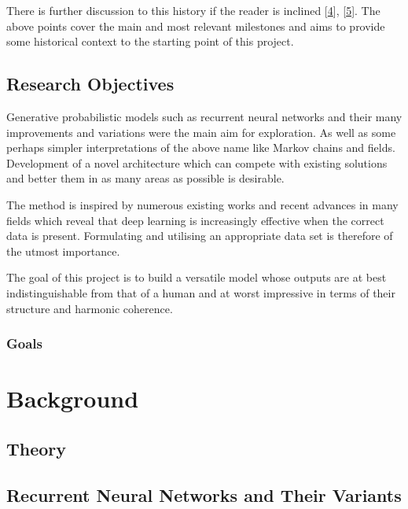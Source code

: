 \documentclass[12pt,]{article}
\begin{document}
There is further discussion to this history if the reader is inclined
{[}\protect\hyperlink{ref-mediumkylemcdonald}{4}{]},
{[}\protect\hyperlink{ref-libdlmusic}{5}{]}. The above points cover the
main and most relevant milestones and aims to provide some historical
context to the starting point of this project.

\hypertarget{research-objectives}{%
\subsection{Research Objectives}\label{research-objectives}}

Generative probabilistic models such as recurrent neural networks and
their many improvements and variations were the main aim for
exploration. As well as some perhaps simpler interpretations of the
above name like Markov chains and fields. Development of a novel
architecture which can compete with existing solutions and better them
in as many areas as possible is desirable.

The method is inspired by numerous existing works and recent advances in
many fields which reveal that deep learning is increasingly effective
when the correct data is present. Formulating and utilising an
appropriate data set is therefore of the utmost importance.

The goal of this project is to build a versatile model whose outputs are
at best indistinguishable from that of a human and at worst impressive
in terms of their structure and harmonic coherence.

\hypertarget{goals}{%
\subsubsection{Goals}\label{goals}}

\hypertarget{background}{%
\section{Background}\label{background}}

\hypertarget{theory}{%
\subsection{Theory}\label{theory}}

\hypertarget{recurrent-neural-networks-and-their-variants}{%
\subsection{Recurrent Neural Networks and Their
Variants}\label{recurrent-neural-networks-and-their-variants}}
\end{document}
